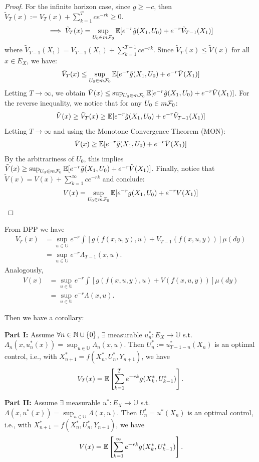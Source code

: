 \begin{proof}
    For the infinite horizon case, since $g \geq -c$, then $\tilde{V}_T(x) := V_T(x) + \sum_{k=1}^T c e^{-rk} \geq 0$.
    \[ \implies \tilde{V}_T(x) = \sup_{U_0 \in m\mathcal{F}_0} \mathbb E[e^{-r} \tilde{g}(X_1, U_0) + e^{-r} \tilde{V}_{T-1}(X_1)] \]
    where $\tilde{V}_{T-1}(X_1) = V_{T-1}(X_1) + \sum_{k=1}^{T-1} c e^{-rk}$. Since $\tilde{V}_T(x) \leq \tilde{V}(x)$ for all $x \in E_X$, we have:
    \[ \tilde{V}_T(x) \leq \sup_{U_0 \in m\mathcal{F}_0} \mathbb E[e^{-r} \tilde{g}(X_1, U_0) + e^{-r} \tilde{V}(X_1)] \]
    Letting $T \to \infty$, we obtain $\tilde{V}(x) \leq \sup_{U_0 \in m\mathcal{F}_0} \mathbb E[e^{-r} \tilde{g}(X_1, U_0) + e^{-r} \tilde{V}(X_1)]$.
    For the reverse inequality, we notice that for any $U_0 \in m\mathcal{F}_0$:
    \[ \tilde{V}(x) \geq \tilde{V}_T(x) \geq \mathbb E[e^{-r} \tilde{g}(X_1, U_0) + e^{-r} \tilde{V}_{T-1}(X_1)] \]
    Letting $T \to \infty$ and using the Monotone Convergence Theorem (MON):
    \[ \tilde{V}(x) \geq \mathbb E[e^{-r} \tilde{g}(X_1, U_0) + e^{-r} \tilde{V}(X_1)] \]
    By the arbitrariness of $U_0$, this implies $\tilde{V}(x) \geq \sup_{U_0 \in m\mathcal{F}_0} \mathbb E[e^{-r} \tilde{g}(X_1, U_0) + e^{-r} \tilde{V}(X_1)]$.
    Finally, notice that $\tilde{V}(x) = V(x) + \sum_{k=1}^\infty c e^{-rk}$ and conclude:
    \[ V(x) = \sup_{U_0 \in m\mathcal{F}_0} \mathbb E[e^{-r} g(X_1, U_0) + e^{-r} V(X_1)] \]
\end{proof}

From DPP we have
\begin{align*}
    V_T(x) &= \sup_{u \in \mathbb{U}} e^{-r} \int \left[ g(f(x,u,y),u) + V_{T-1}(f(x,u,y)) \right] \mu(dy) \\
    &= \sup_{u \in \mathbb{U}} e^{-r} \Lambda_{T-1}(x,u).
\end{align*}
Analogously,
\begin{align*}
    V(x) &= \sup_{u \in \mathbb{U}} e^{-r} \int \left[ g(f(x,u,y),u) + V(f(x,u,y)) \right] \mu(dy) \\
    &= \sup_{u \in \mathbb{U}} e^{-r} \Lambda(x,u).
\end{align*}

Then we have a corollary:

\begin{corollary}
    \textbf{Part I:} Assume $\forall n \in \mathbb N \cup \{0\}$, $\exists$ measurable $u_n^*: E_X \to \mathbb{U}$ s.t. $\Lambda_n(x, u_n^*(x)) = \sup_{u \in \mathbb{U}} \Lambda_n(x,u)$. Then $U_n^* := u_{T-1-n}^*(X_n)$ is an optimal control, i.e., with $X_{n+1}^* = f(X_n^*, U_n^*, Y_{n+1})$, we have
    \[ V_T(x) = \mathbb E \left[ \sum_{k=1}^T e^{-rk} g(X_k^*, U_{k-1}^*) \right]. \]
    
    \textbf{Part II:} Assume $\exists$ measurable $u^*: E_X \to \mathbb{U}$ s.t. $\Lambda(x, u^*(x)) = \sup_{u \in \mathbb{U}} \Lambda(x,u)$. Then $U_n^* = u^*(X_n)$ is an optimal control, i.e., with $X_{n+1}^* = f(X_n^*, U_n^*, Y_{n+1})$, we have
    \[ V(x) = \mathbb E \left[ \sum_{k=1}^\infty e^{-rk} g(X_k^*, U_{k-1}^*) \right]. \]
\end{corollary}

